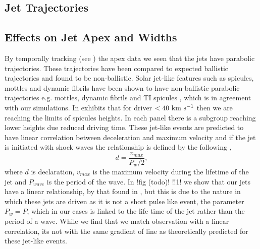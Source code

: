 \subsection{Jet Trajectories}
\subsection{Effects on Jet Apex and Widths}
By temporally tracking (see ) the apex data we seen that the jets have parabolic trajectories. These trajectories have been compared to expected ballistic trajectories and found to be non-ballistic. Solar jet-like features such as spicules, mottles and dynamic fibrils have been shown to have non-ballistic parabolic trajectories e.g. mottles, dynamic fibrils and TI spicules \citep{ Hansteen2006ApJ,Rouppe2007ApJ660L169R,Pontieu2007PASJ}, which is in agreement with our simulations. In  exhibits that for driver $<40 ~\rm{km ~s^{-1}}$ then we are reaching the limits of spicules heights. In each panel there is a subgroup reaching lower heights due reduced driving time. \np  
%
These jet-like events are predicted to have linear correlation between deceleration and maximum velocity and if the jet is initiated with shock waves the relationship is defined by the following \citep{Heggland2007ApJ6661277H},
\begin{equation}
d = \frac{v_{max}}{P_{w}/2},
\end{equation}
where $d$ is declaration, $v_{max}$ is the maximum velocity during the lifetime of the jet and $P_{wave}$ is the period of the wave. In !fig (todo)! !!1! we show that our jets have a linear relationship, by that found in \citep{Heggland2007ApJ6661277H}, but this is due to the nature in which these jets are driven as it is not a short pulse like event, the parameter $P_{w}=P$, which in our cases is linked to the life time of the jet rather than the period of a wave. While we find that we match observation with a linear correlation, its not with the same gradient of line as theoretically predicted for these jet-like events. \np
